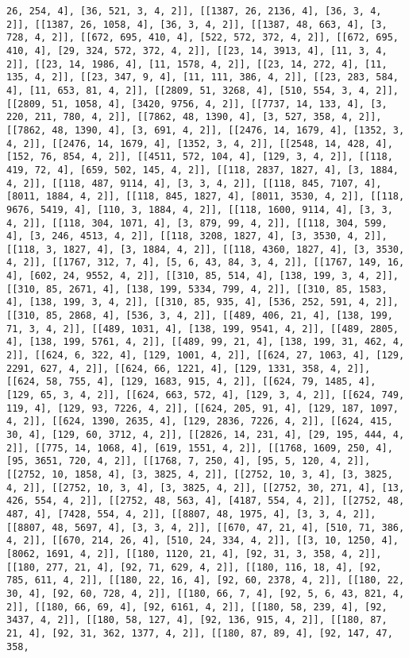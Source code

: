 \documentclass[12pt,fleqn]{article}\usepackage{../../common}
\begin{document}
\begin{verbatim}
26, 254, 4], [36, 521, 3, 4, 2]], [[1387, 26, 2136, 4], [36, 3, 4, 2]], [[1387, 26, 1058, 4], [36, 3, 4, 2]], [[1387, 48, 663, 4], [3, 728, 4, 2]], [[672, 695, 410, 4], [522, 572, 372, 4, 2]], [[672, 695, 410, 4], [29, 324, 572, 372, 4, 2]], [[23, 14, 3913, 4], [11, 3, 4, 2]], [[23, 14, 1986, 4], [11, 1578, 4, 2]], [[23, 14, 272, 4], [11, 135, 4, 2]], [[23, 347, 9, 4], [11, 111, 386, 4, 2]], [[23, 283, 584, 4], [11, 653, 81, 4, 2]], [[2809, 51, 3268, 4], [510, 554, 3, 4, 2]], [[2809, 51, 1058, 4], [3420, 9756, 4, 2]], [[7737, 14, 133, 4], [3, 220, 211, 780, 4, 2]], [[7862, 48, 1390, 4], [3, 527, 358, 4, 2]], [[7862, 48, 1390, 4], [3, 691, 4, 2]], [[2476, 14, 1679, 4], [1352, 3, 4, 2]], [[2476, 14, 1679, 4], [1352, 3, 4, 2]], [[2548, 14, 428, 4], [152, 76, 854, 4, 2]], [[4511, 572, 104, 4], [129, 3, 4, 2]], [[118, 419, 72, 4], [659, 502, 145, 4, 2]], [[118, 2837, 1827, 4], [3, 1884, 4, 2]], [[118, 487, 9114, 4], [3, 3, 4, 2]], [[118, 845, 7107, 4], [8011, 1884, 4, 2]], [[118, 845, 1827, 4], [8011, 3530, 4, 2]], [[118, 9676, 5419, 4], [110, 3, 1884, 4, 2]], [[118, 1600, 9114, 4], [3, 3, 4, 2]], [[118, 304, 1071, 4], [3, 879, 99, 4, 2]], [[118, 304, 599, 4], [3, 246, 4513, 4, 2]], [[118, 3208, 1827, 4], [3, 3530, 4, 2]], [[118, 3, 1827, 4], [3, 1884, 4, 2]], [[118, 4360, 1827, 4], [3, 3530, 4, 2]], [[1767, 312, 7, 4], [5, 6, 43, 84, 3, 4, 2]], [[1767, 149, 16, 4], [602, 24, 9552, 4, 2]], [[310, 85, 514, 4], [138, 199, 3, 4, 2]], [[310, 85, 2671, 4], [138, 199, 5334, 799, 4, 2]], [[310, 85, 1583, 4], [138, 199, 3, 4, 2]], [[310, 85, 935, 4], [536, 252, 591, 4, 2]], [[310, 85, 2868, 4], [536, 3, 4, 2]], [[489, 406, 21, 4], [138, 199, 71, 3, 4, 2]], [[489, 1031, 4], [138, 199, 9541, 4, 2]], [[489, 2805, 4], [138, 199, 5761, 4, 2]], [[489, 99, 21, 4], [138, 199, 31, 462, 4, 2]], [[624, 6, 322, 4], [129, 1001, 4, 2]], [[624, 27, 1063, 4], [129, 2291, 627, 4, 2]], [[624, 66, 1221, 4], [129, 1331, 358, 4, 2]], [[624, 58, 755, 4], [129, 1683, 915, 4, 2]], [[624, 79, 1485, 4], [129, 65, 3, 4, 2]], [[624, 663, 572, 4], [129, 3, 4, 2]], [[624, 749, 119, 4], [129, 93, 7226, 4, 2]], [[624, 205, 91, 4], [129, 187, 1097, 4, 2]], [[624, 1390, 2635, 4], [129, 2836, 7226, 4, 2]], [[624, 415, 30, 4], [129, 60, 3712, 4, 2]], [[2826, 14, 231, 4], [29, 195, 444, 4, 2]], [[775, 14, 1068, 4], [619, 1551, 4, 2]], [[1768, 1609, 250, 4], [95, 3651, 720, 4, 2]], [[1768, 7, 250, 4], [95, 5, 120, 4, 2]], [[2752, 10, 1858, 4], [3, 3825, 4, 2]], [[2752, 10, 3, 4], [3, 3825, 4, 2]], [[2752, 10, 3, 4], [3, 3825, 4, 2]], [[2752, 30, 271, 4], [13, 426, 554, 4, 2]], [[2752, 48, 563, 4], [4187, 554, 4, 2]], [[2752, 48, 487, 4], [7428, 554, 4, 2]], [[8807, 48, 1975, 4], [3, 3, 4, 2]], [[8807, 48, 5697, 4], [3, 3, 4, 2]], [[670, 47, 21, 4], [510, 71, 386, 4, 2]], [[670, 214, 26, 4], [510, 24, 334, 4, 2]], [[3, 10, 1250, 4], [8062, 1691, 4, 2]], [[180, 1120, 21, 4], [92, 31, 3, 358, 4, 2]], [[180, 277, 21, 4], [92, 71, 629, 4, 2]], [[180, 116, 18, 4], [92, 785, 611, 4, 2]], [[180, 22, 16, 4], [92, 60, 2378, 4, 2]], [[180, 22, 30, 4], [92, 60, 728, 4, 2]], [[180, 66, 7, 4], [92, 5, 6, 43, 821, 4, 2]], [[180, 66, 69, 4], [92, 6161, 4, 2]], [[180, 58, 239, 4], [92, 3437, 4, 2]], [[180, 58, 127, 4], [92, 136, 915, 4, 2]], [[180, 87, 21, 4], [92, 31, 362, 1377, 4, 2]], [[180, 87, 89, 4], [92, 147, 47, 358, 
\end{verbatim}
\end{document}
